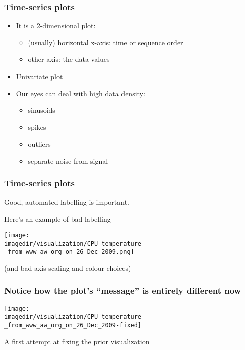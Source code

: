 \begin{frame}\frametitle{Time-series plots}
	\begin{itemize}
		\item	It is a 2-dimensional plot: 
		\begin{itemize}
			\item	(usually) horizontal x-axis: time or sequence order 
			\item	other axis: the data values 
		\end{itemize}
		\item	Univariate plot 
	\end{itemize}
	\begin{itemize}
		\item	Our eyes can deal with high data density: 
		\begin{itemize}
			\item	sinusoids 
			\item	spikes 
			\item	outliers 
			\item	separate noise from signal 
		\end{itemize}
	\end{itemize}
\end{frame}

\begin{frame}\frametitle{Time-series plots}
	
	Good, automated labelling is important.
	
	Here's an example of bad labelling
	\begin{center}
		\texttt{[image: \\imagedir/visualization/CPU-temperature\_-\_from\_www\_aw\_org\_on\_26\_Dec\_2009.png]}
	\end{center}
	(and bad axis scaling and colour choices)
	
\end{frame}

\begin{frame}\frametitle{Notice how the plot's ``message'' is entirely different now}
	\begin{center}
		\texttt{[image: \\imagedir/visualization/CPU-temperature\_-\_from\_www\_aw\_org\_on\_26\_Dec\_2009-fixed]}
	\end{center}
	A first attempt at fixing the prior visualization
\end{frame}

